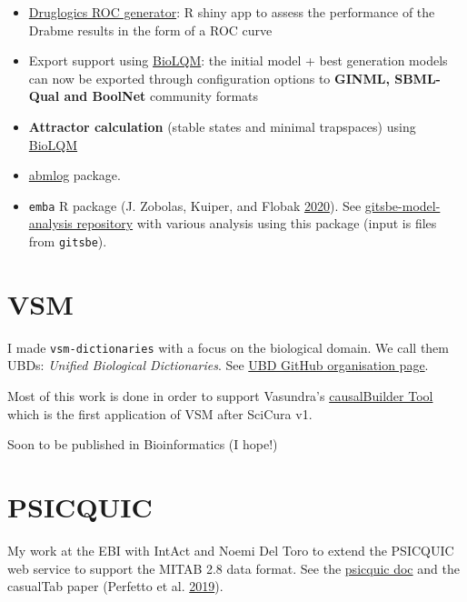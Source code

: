 \documentclass[
  12pt,
]{book}
\begin{document}
\begin{itemize}
\item
  \href{https://github.com/bblodfon/druglogics-roc}{Druglogics ROC generator}:
  R shiny app to assess the performance of the Drabme results in the form of a
  ROC curve
\item
  Export support using \href{https://github.com/colomoto/bioLQM}{BioLQM}: the initial model + best generation models can now be exported through configuration options to \textbf{GINML, SBML-Qual and BoolNet} community formats
\item
  \textbf{Attractor calculation} (stable states and minimal trapspaces) using \href{https://github.com/colomoto/bioLQM}{BioLQM}
\item
  \href{https://github.com/druglogics/abmlog}{abmlog} package.
\item
  \texttt{emba} R package (J. Zobolas, Kuiper, and Flobak \protect\hyperlink{ref-Zobolas2020}{2020}).
  See \href{https://github.com/bblodfon/gitsbe-model-analysis/}{gitsbe-model-analysis repository} with various analysis using this package (input is files from \texttt{gitsbe}).
\end{itemize}

\hypertarget{vsm}{%
\section*{VSM}\label{vsm}}

I made \texttt{vsm-dictionaries} with a focus on the biological domain.
We call them UBDs: \emph{Unified Biological Dictionaries}.
See \href{https://github.com/UniBioDicts}{UBD GitHub organisation page}.

Most of this work is done in order to support Vasundra's \href{https://mi2cast.github.io/causalBuilder/}{causalBuilder Tool} which is the first application of VSM after SciCura v1.

Soon to be published in Bioinformatics (I hope!)

\hypertarget{psicquic}{%
\section*{PSICQUIC}\label{psicquic}}

My work at the EBI with IntAct and Noemi Del Toro to extend the PSICQUIC web service to support the
MITAB 2.8 data format.
See the \href{http://psicquic.github.io/MITAB28Format.html}{psicquic doc} and the casualTab paper (Perfetto et al. \protect\hyperlink{ref-Perfetto2019}{2019}).
\end{document}
